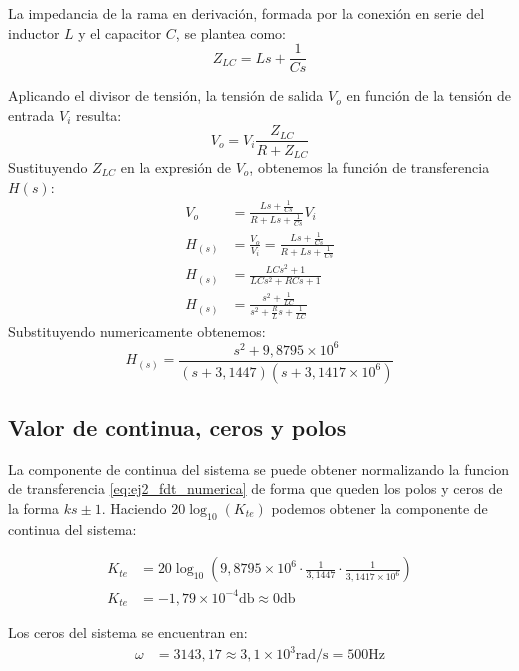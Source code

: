 La impedancia de la rama en derivación, formada por la conexión en serie del inductor $L$ y el capacitor $C$,
se plantea como:
\begin{equation}
    Z_{LC} = L s + \frac{1}{C s}
\end{equation}

Aplicando el divisor de tensión, la tensión de salida $V_o$ en función de la tensión de entrada $V_i$ resulta:
\begin{equation}
    V_o = V_i \frac{Z_{LC}}{R + Z_{LC}}
\end{equation}
Sustituyendo $Z_{LC}$ en la expresión de $V_o$, obtenemos la función de transferencia $H(s)$:
{
\allowdisplaybreaks
\begin{align}
    V_o &= \frac{L s + \frac{1}{C s}}{R + L s + \frac{1}{C s}} V_i \nonumber \\[6pt]
    H_{(s)} &= \frac{V_o}{V_i} = \frac{L s + \frac{1}{C s}}{R + L s + \frac{1}{C s}} \nonumber \\[6pt]
    H_{(s)} &= \frac{L C s^2 + 1}{L C s^2 + R C s + 1} \nonumber \\[6pt]
    H_{(s)} &= \frac{s^2 + \frac{1}{LC}}{s^2 + \frac{R}{L} s + \frac{1}{LC}}
    \label{eq:ej2_fdt_simbolica}
\end{align}
}
Substituyendo numericamente obtenemos:
\begin{equation}
    H_{(s)} = \frac{s^2 + 9,8795 \times 10^6}{\left(s + 3,1447\right) \left(s + 3,1417 \times 10^6\right)}
    \label{eq:ej2_fdt_numerica}
\end{equation}

\subsection{Valor de continua, ceros y polos}

La componente de continua del sistema se puede obtener normalizando la funcion de transferencia \ref{eq:ej2_fdt_numerica} de
forma que queden los polos y ceros de la forma $ks \pm 1$. Haciendo $20\log_{10}\left(K_{te}\right)$ podemos obtener la
componente de continua del sistema:

\begin{align*}
    K_{te} &= 20 \log_{10}\left(9,8795 \times 10^6 \cdot \frac{1}{3,1447} \cdot \frac{1}{3,1417 \times 10^6}\right) \\[6pt]
    K_{te} &= -1,79 \times 10^{-4} \si{\decibel} \approx 0 \si{\decibel}
\end{align*}

Los ceros del sistema se encuentran en:
\begin{align*}
    \omega &= 3143,17 \approx 3,1 \times 10^3 \si{\radian\per\second} = 500 \si{\hertz}
\end{align*}

